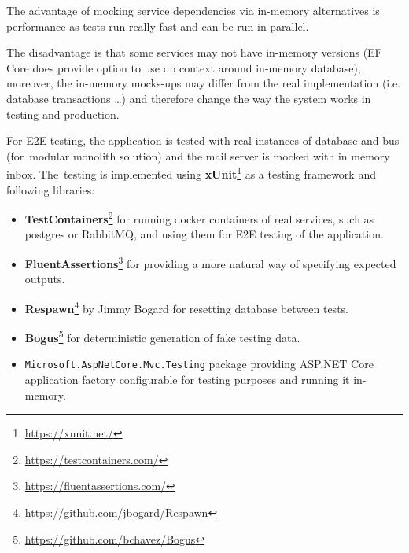 The advantage of mocking service dependencies via in-memory alternatives is performance as tests run really fast and can be run in parallel. 

The disadvantage is that some services may not have in-memory versions (EF Core does provide option to use db context around in-memory database), moreover, the in-memory mocks-ups may differ from the real implementation (i.e. database transactions \dots) and therefore change the way the system works in testing and production.

For E2E testing, the application is tested with real instances of database and bus (for~modular monolith solution) and the mail server is mocked with in memory inbox. The~testing is implemented using \textbf{xUnit}\footnote{\url{https://xunit.net/}} as a testing framework and following libraries:
\begin{itemize}
    \item \textbf{TestContainers}\footnote{\url{https://testcontainers.com/}} for running docker containers of real services, such as postgres or RabbitMQ, and using them for E2E testing of the application.
    \item \textbf{FluentAssertions}\footnote{\url{https://fluentassertions.com/}} for providing a more natural way of specifying expected outputs.
    \item \textbf{Respawn}\footnote{\url{https://github.com/jbogard/Respawn}} by Jimmy Bogard for resetting database between tests.
    \item \textbf{Bogus}\footnote{\url{https://github.com/bchavez/Bogus}} for deterministic generation of fake testing data.
    \item \texttt{Microsoft.AspNetCore.Mvc.Testing} package providing ASP.NET Core application factory configurable for testing purposes and running it in-memory.
\end{itemize}

